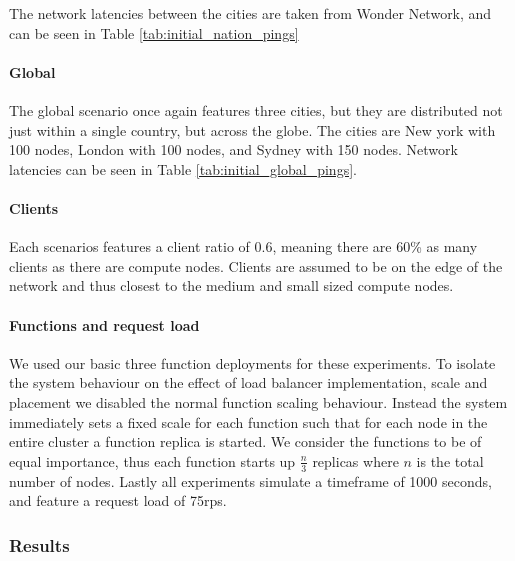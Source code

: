     

The network latencies between the cities are taken from Wonder Network\cite{wondernetworkGlobalPingStatistics}, and can be seen in Table \ref{tab:initial_nation_pings}

\paragraph{Global}
The global scenario once again features three cities, but they are distributed not just within a single country, but across the globe.
The cities are New york with 100 nodes, London with 100 nodes, and Sydney with 150 nodes.
Network latencies can be seen in Table \ref{tab:initial_global_pings}.

\paragraph{Clients}
Each scenarios features a client ratio of 0.6, meaning there are 60\% as many clients as there are compute nodes.
Clients are assumed to be on the edge of the network and thus closest to the medium and small sized compute nodes.

\paragraph{Functions and request load}
We used our basic three function deployments for these experiments.
To isolate the system behaviour on the effect of load balancer implementation, scale and placement we disabled the normal function scaling behaviour.
Instead the system immediately sets a fixed scale for each function such that for each node in the entire cluster a function replica is started.
We consider the functions to be of equal importance, thus each function starts up $\frac{n}{3}$ replicas where $n$ is the total number of nodes.
Lastly all experiments simulate a timeframe of 1000 seconds, and feature a request load of 75\gls{rps}.

\subsubsection{Results}



